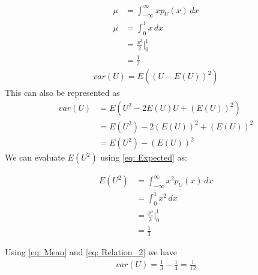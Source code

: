 \documentclass[journal,12pt,twocolumn]{IEEEtran}
\begin{document}
\begin{enumerate}[label=\thesection.\arabic*,ref=\thesection.\theenumi]
\begin{align}
    \mu &= \int_{-\infty}^{\infty} x p_U(x) \,dx\label{eq:Relation_1}\\
		\mu &= \int_{0}^{1} x \,dx \\
		&= \frac{x^2}{2} \big|^{1}_{0} \\
		&= \frac{1}{2} 	\label{eq: Mean}
\end{align}
\begin{align}
    var(U) = E((U - E(U))^2)
\end{align}
This can also be represented as
\begin{align}
		var(U) &= E(U^2 - 2E(U)U + (E(U))^2) \\
		&= E(U^2) - 2(E(U))^2 + (E(U))^2 \\
		&= E(U^2) - (E(U))^2
		\label{eq: Relation_2}
\end{align}
We can evaluate $E(U^2)$ using \eqref{eq: Expected} as:
	
\begin{align}
    	E(U^2) &= \int_{-\infty}^{\infty} x^2 p_U(x) \,dx \\
    	&= \int_{0}^{1} x^2 \,dx \\
    	&= \frac{x^3}{3} \big|^{1}_{0} \\
    	&= \frac{1}{3}
\end{align}

    Using \eqref{eq: Mean} and \eqref{eq: Relation_2} we have
\begin{align}
    	var(U) = \frac{1}{3} - \frac{1}{4} = \frac{1}{12}
\end{align}
\end{enumerate}
\end{document}
